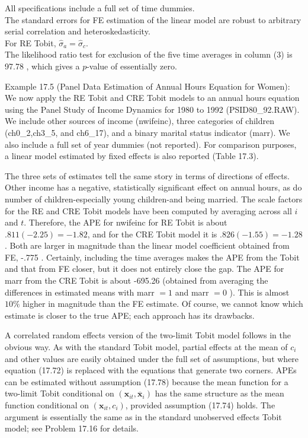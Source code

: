 \documentclass[10pt]{article}
\begin{document}
All specifications include a full set of time dummies.\\
The standard errors for FE estimation of the linear model are robust to arbitrary serial correlation and heteroskedasticity.\\
For RE Tobit, $\hat{\sigma}_{a}=\hat{\sigma}_{c}$.\\
The likelihood ratio test for exclusion of the five time averages in column (3) is 97.78 , which gives a $p$-value of essentially zero.

Example 17.5 (Panel Data Estimation of Annual Hours Equation for Women): We now apply the RE Tobit and CRE Tobit models to an annual hours equation using the Panel Study of Income Dynamics for 1980 to 1992 (PSID80\_92.RAW). We include other sources of income (nwifeinc), three categories of children (ch0\_2,ch3\_5, and ch6\_17), and a binary marital status indicator (marr). We also include a full set of year dummies (not reported). For comparison purposes, a linear model estimated by fixed effects is also reported (Table 17.3).

The three sets of estimates tell the same story in terms of directions of effects. Other income has a negative, statistically significant effect on annual hours, as do number of children-especially young children-and being married. The scale factors for the RE and CRE Tobit models have been computed by averaging across all $i$ and $t$. Therefore, the APE for nwifeinc for RE Tobit is about $.811(-2.25)=-1.82$, and for the CRE Tobit model it is $.826(-1.55)=-1.28$. Both are larger in magnitude than the linear model coefficient obtained from FE, -.775 . Certainly, including the time averages makes the APE from the Tobit and that from FE closer, but it does not entirely close the gap. The APE for marr from the CRE Tobit is about -695.26 (obtained from averaging the differences in estimated means with marr $=1$ and marr $=0$ ). This is almost $10 \%$ higher in magnitude than the FE estimate. Of course, we cannot know which estimate is closer to the true APE; each approach has its drawbacks.

A correlated random effects version of the two-limit Tobit model follows in the obvious way. As with the standard Tobit model, partial effects at the mean of $c_{i}$ and other values are easily obtained under the full set of assumptions, but where equation (17.72) is replaced with the equations that generate two corners. APEs can be estimated without assumption (17.78) because the mean function for a two-limit Tobit conditional on $\left(\mathbf{x}_{i t}, \overline{\mathbf{x}}_{i}\right)$ has the same structure as the mean function conditional on $\left(\mathbf{x}_{i t}, c_{i}\right)$, provided assumption (17.74) holds. The argument is essentially the same as in the standard unobserved effects Tobit model; see Problem 17.16 for details.
\end{document}
